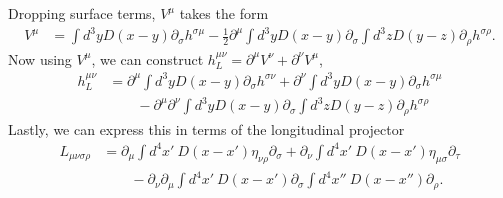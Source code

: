 \documentclass[10pt,letterpaper]{article}
\begin{document}
Dropping surface terms, $V^\mu$ takes the form
\begin{align}
V^\mu &= \int d^3y D(x-y)\partial_\sigma h^{\sigma\mu} -  \frac12
\partial^\mu \int d^3y D(x-y) \partial_\sigma \int d^3z D(y-z)\partial_\rho h^{\sigma\rho}.
\end{align}
Now using $V^\mu$, we can  construct $h^{\mu\nu}_L = \partial^\mu V^\nu + \partial^\nu V^\mu$, 
\begin{align}
h^{\mu\nu}_L &= \partial^\mu \int d^3y D(x-y)\partial_\sigma h^{\sigma\nu} + \partial^\nu \int d^3y D(x-y)\partial_\sigma h^{\sigma\mu} 
\\
&\qquad -  
\partial^\mu\partial^\nu \int d^3y D(x-y) \partial_\sigma \int d^3z D(y-z)\partial_\rho h^{\sigma\rho}
\end{align}
Lastly, we can express this in terms of the longitudinal projector
\begin{align}
L_{\mu\nu\sigma\rho} &= \partial_\mu \int d^4x'\ D(x-x') \eta_{\nu\rho}\partial_\sigma + \partial_\nu \int d^4x'\ D(x-x') \eta_{\mu\sigma}\partial_\tau
\\
&\qquad - \partial_\nu\partial_\mu \int d^4x'\ D(x-x') \partial_\sigma \int d^4x''\ D(x-x'') \partial_\rho.
\end{align}
\end{document}

